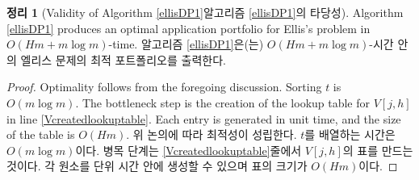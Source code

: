 \documentclass[11pt]{article} %
\newtheorem{theorem}{Theorem}
\theoremstyle{definition}
\newtheorem{theorem}{정리}
\theoremstyle{definition}
\begin{document}
\ifen {
\begin{algorithm}[h] 
\caption{Dynamic program for Ellis's problem with integral application costs.} \label{ellisDP1}
\KwIn{Utility values $t \in(0, \infty)^m$, admissions probabilities $f \in (0, 1]^m$, application costs $g \in \mathbb{N}^m$, budget $H \in\mathbb{N}$.}
Index schools in ascending order by $t$\;
Fill a lookup table with the values of $V[j, h]$\; \label{Vcreatedlookuptable}
$h \gets H$\;
$\mathcal{X} \gets \O$\;
\For{$j = m, m-1, \dots, 1$}{
	\If{$V[j-1, h] < V[j, h]$}{
		$\mathcal{X} \gets \mathcal{X}\cup\{j\}$\; 
		$h \gets h - g_j$\;
	}
}
\Return{$\mathcal{X}$}
\end{algorithm}
} \else {
\begin{algorithm}[h] 
\caption{정수 지원 비용의 엘리스 문제를 위한 동적 계획 해법.} \label{ellisDP1}
\KwIn{효용 모수 $t \in(0, \infty)^m$, 합격 확률 $f \in (0, 1]^m$, 지원 비용 $g \in \mathbb{N}^m$, 예산 $H \in\mathbb{N}$.}
$t$의 순서대로 학교를 배열한다\;
$V[j, h]$의 값으로 표를 채운다\; \label{Vcreatedlookuptable}
$h \gets H$\;
$\mathcal{X} \gets \O$\;
\For{$j = m, m-1, \dots, 1$}{
	\If{$V[j-1, h] < V[j, h]$}{
		$\mathcal{X} \gets \mathcal{X}\cup\{j\}$\; 
		$h \gets h - g_j$\;
	}
}
\Return{$\mathcal{X}$}
\end{algorithm}
}\fi

\begin{theorem}[\ifen Validity of Algorithm \ref{ellisDP1}\else 알고리즘 \ref{ellisDP1}의 타당성\fi]
\ifen 
Algorithm \ref{ellisDP1} produces an optimal application portfolio for Ellis's problem in $O(H m + m \log m)$-time.
\else
알고리즘 \ref{ellisDP1}은(는) $O(H m + m \log m)$-시간 안의 엘리스 문제의 최적 포트폴리오를 출력한다.
\fi
\end{theorem}

\begin{proof}
\ifen
Optimality follows from the foregoing discussion. Sorting $t$ is $O(m \log m)$. The bottleneck step is the creation of the lookup table for $V[j, h]$ in line \ref{Vcreatedlookuptable}. Each entry is generated in unit time, and the size of the table is $O(Hm)$. 
\else
위 논의에 따라 최적성이 성립한다. $t$를 배열하는 시간은 $O(m \log m)$이다. 병목 단계는 \ref{Vcreatedlookuptable}줄에서 $V[j, h]$의 표를 만드는 것이다. 각 원소를 단위 시간 안에 생성할 수 있으며 표의 크기가 $O(Hm)$이다.
\fi
\end{proof}
\end{document}
